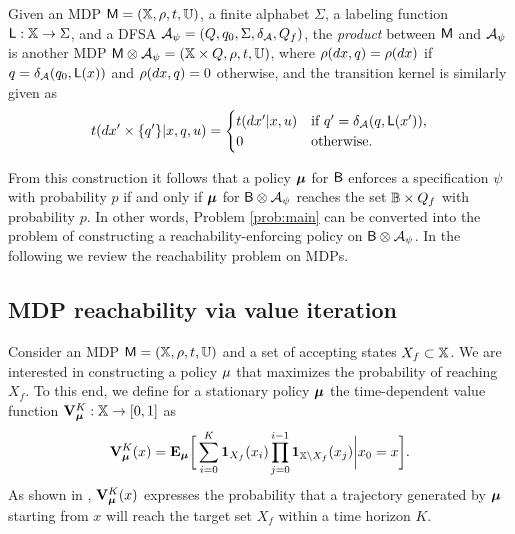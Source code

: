 \documentclass{ifacconf}
\newcommand{\ind}{\mathbf{1}}
\begin{document}
\begin{definition}
\label{def:product}
  Given an MDP $\mathsf{M} = ({\mathbb{X}}, \rho, t, {\mathbb{U}})$, a finite alphabet $\Sigma$, a labeling function $\mathsf{L} : {\mathbb{X}}\rightarrow\Sigma$, and a DFSA  $\mathcal{A}_\psi = (Q, q_0, \Sigma, \delta_{\mathcal{A}}, Q_f)$, the \emph{product} between $\mathsf{M}$ and $\mathcal{A}_\psi$ is another MDP $\mathsf{M}\otimes\mathcal{A}_\psi = ({\mathbb{X}} \times Q, \relax\rho, \relax{t}, {\mathbb{U}})$, where $\relax\rho(dx,q) = \rho(dx)$ if $q= \delta_{\mathcal{A}}(q_0,\mathsf L(x))$ and $ \relax\rho(dx,q) =0$ otherwise, and the transition kernel is similarly given as
  \begin{equation*}
    \relax{t}(d x'\times\{q'\}|x,q,u) = \begin{cases}t(dx'|x,u)& \text{if } q' =\delta_{\mathcal{A}}(q,\mathsf{L}(x')),\\ 0 & \text{otherwise.}  \end{cases}
  \end{equation*}
\end{definition}

From this construction it follows that a policy ${\boldsymbol{\mu}}$ for $\mathsf{B}$ enforces a specification $\psi$ with probability $p$ if and only if ${\boldsymbol{\mu}}$ for $\mathsf{B} \otimes \mathcal{A}_\psi$ reaches the set $\mathbb{B} \times Q_f$ with probability $p$. In other words, Problem \ref{prob:main} can be converted into the problem of constructing a reachability-enforcing policy on $\mathsf{B} \otimes \mathcal{A}_\psi$. In the following we review the reachability problem on MDPs.

\subsection{MDP reachability via value iteration}

Consider an MDP $\mathsf{M} = ({\mathbb{X}}, \rho, t, {\mathbb{U}})$ and a set of accepting states $X_f \subset {\mathbb{X}}$. We are interested in constructing a policy ${\mu}$ that maximizes the probability of reaching $X_f$. To this end, we define for a stationary policy ${\boldsymbol{\mu}}$ the time-dependent value function $\mathbf V_{\boldsymbol{\mu}}^K:{\mathbb{X}}\rightarrow [0,1]$ as
\begin{equation}
\label{eq:Valfunc}
  \mathbf V^K_\polb(x)=\Ex_\polb \bigg[ \sum\limits_{ i=0 }^K \ind_{X_f}( x_i) \prod \limits_{\mathclap{j = 0}}^{i-1}\ind_{ \X \setminus X_f}( x_j ) \bigg| x_0 = x \bigg].
\end{equation}
As shown in \citep{Abate1}, $\mathbf V_{\boldsymbol{\mu}}^K (x)$ expresses the probability that a trajectory generated by ${\boldsymbol{\mu}}$ starting from $x$ will reach the target set $X_f$ within a time horizon $K$.
\end{document}
